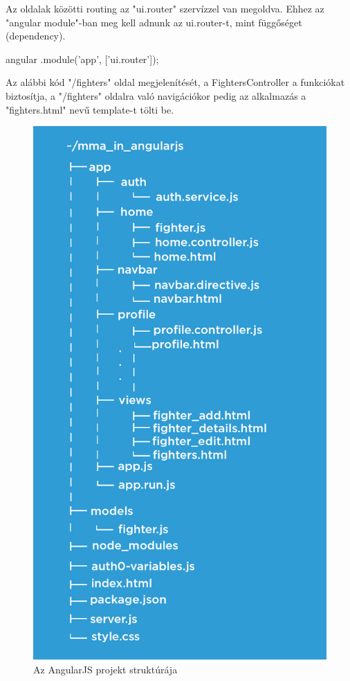 
Az oldalak közötti routing az "ui.router" szervízzel van megoldva.
Ehhez az "angular module"-ban meg kell adnunk az ui.router-t, mint függőséget (dependency).

\begin{cpp}
angular
    .module('app', ['ui.router']);
\end{cpp}

Az alábbi kód "/fighters" oldal megjelenítését, a FightersController a funkciókat biztosítja, a "/fighters" oldalra való navigációkor pedig az alkalmazás a "fighters.html" nevű template-t tölti be.



\begin{figure}[htb]
\centering
\includegraphics[scale=0.8]{kepek/mma_in_angularjs.jpeg}
\caption{Az AngularJS projekt struktúrája}
\label{fig:angularjs_structure}
\end{figure}
